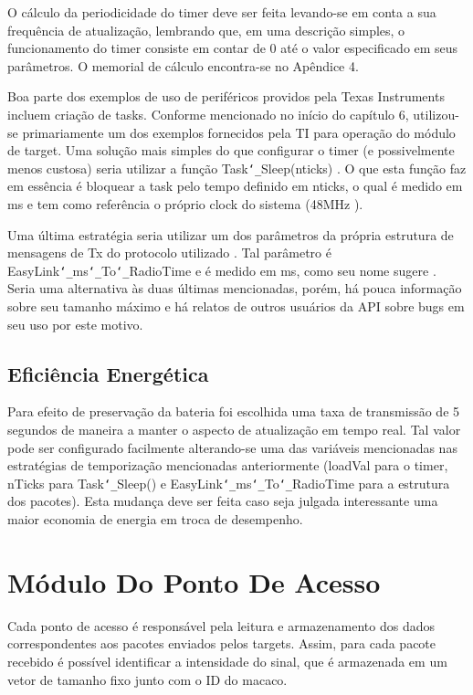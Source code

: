 O cálculo da periodicidade do timer deve ser feita levando-se em conta a sua frequência de atualização, lembrando que, em uma descrição simples, o funcionamento do timer consiste em contar de 0 até o valor especificado em seus parâmetros. O memorial de cálculo encontra-se no Apêndice 4.

Boa parte dos exemplos de uso de periféricos providos pela Texas Instruments incluem criação de tasks. Conforme mencionado no início do capítulo 6, utilizou-se primariamente um dos exemplos fornecidos pela TI para operação do módulo de target. Uma solução mais simples do que configurar o timer (e possivelmente menos custosa) seria utilizar a função Task\texttt{\char`_}Sleep(nticks) \cite{task-modules}. O que esta função faz em essência é bloquear a task pelo tempo definido em nticks, o qual é medido em ms e tem como referência o próprio clock do sistema (48MHz \cite{st-datasheet}).

Uma última estratégia seria utilizar um dos parâmetros da própria estrutura de mensagens de Tx do protocolo utilizado \cite{forum-easylink}. Tal parâmetro é EasyLink\texttt{\char`_}ms\texttt{\char`_}To\texttt{\char`_}RadioTime e é medido em ms, como seu nome sugere \cite{easylink}. Seria uma alternativa às duas últimas mencionadas, porém, há pouca informação sobre seu tamanho máximo e há relatos de outros usuários da API sobre bugs em seu uso por este motivo.

\subsection{Eficiência Energética}

Para efeito de preservação da bateria foi escolhida uma taxa de transmissão de 5 segundos de maneira a manter o aspecto de atualização em tempo real. Tal valor pode ser configurado facilmente alterando-se uma das variáveis mencionadas nas estratégias de temporização mencionadas anteriormente (loadVal para o timer, nTicks para Task\texttt{\char`_}Sleep() e EasyLink\texttt{\char`_}ms\texttt{\char`_}To\texttt{\char`_}RadioTime para a estrutura dos pacotes). Esta mudança deve ser feita caso seja julgada interessante uma maior economia de energia em troca de desempenho.

\section{Módulo Do Ponto De Acesso}

Cada ponto de acesso é responsável pela leitura e armazenamento dos dados correspondentes aos pacotes enviados pelos targets. Assim, para cada pacote recebido é possível identificar a intensidade do sinal, que é armazenada em um vetor de tamanho fixo junto com o ID do macaco.

